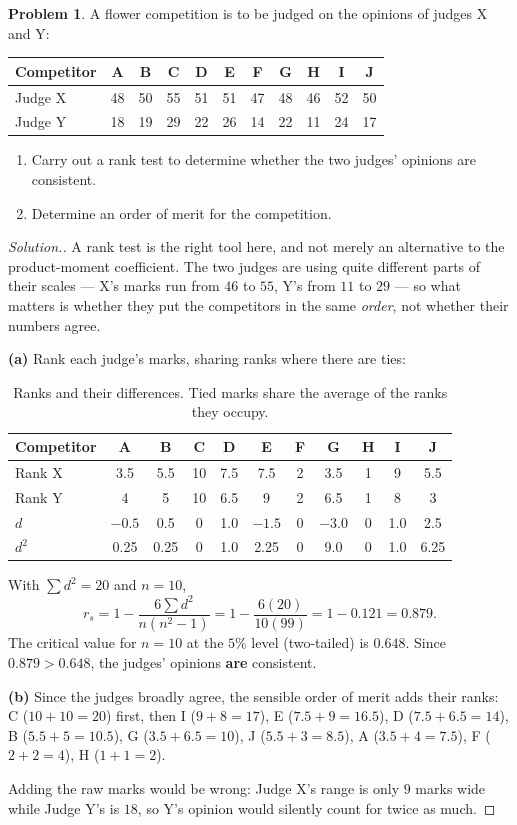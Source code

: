 \documentclass[11pt,a4paper]{article}
\theoremstyle{definition}
\newtheorem{problemx}{Problem}[section]
\newenvironment{problem}{\begin{problemx}}{\end{problemx}}
\newenvironment{solution}
  {\renewcommand{\qedsymbol}{}\begin{proof}[\textit{Solution}.]}
  {\end{proof}}
\begin{document}
\begin{problem}
A flower competition is to be judged on the opinions of judges X and Y:
\begin{table}[H]
\centering
\begin{tabular}{|l|c|c|c|c|c|c|c|c|c|c|}
\hline
Competitor & A & B & C & D & E & F & G & H & I & J\\
\hline
Judge X & 48 & 50 & 55 & 51 & 51 & 47 & 48 & 46 & 52 & 50\\
Judge Y & 18 & 19 & 29 & 22 & 26 & 14 & 22 & 11 & 24 & 17\\
\hline
\end{tabular}
\end{table}
\begin{enumerate}
\item[(a).] Carry out a rank test to determine whether the two judges' opinions are consistent.
\item[(b).] Determine an order of merit for the competition.
\end{enumerate}
\end{problem}

\begin{solution}
A rank test is the right tool here, and not merely an alternative to the product-moment
coefficient. The two judges are using quite different parts of their scales --- X's marks run
from $46$ to $55$, Y's from $11$ to $29$ --- so what matters is whether they put the
competitors in the same \emph{order}, not whether their numbers agree.

\textbf{(a)} Rank each judge's marks, sharing ranks where there are ties:
\begin{table}[H]
\centering
\begin{tabular}{|l|c|c|c|c|c|c|c|c|c|c|}
\hline
Competitor & A & B & C & D & E & F & G & H & I & J\\
\hline
Rank X & 3.5 & 5.5 & 10 & 7.5 & 7.5 & 2 & 3.5 & 1 & 9 & 5.5\\
Rank Y & 4 & 5 & 10 & 6.5 & 9 & 2 & 6.5 & 1 & 8 & 3\\
$d$ & $-0.5$ & 0.5 & 0 & 1.0 & $-1.5$ & 0 & $-3.0$ & 0 & 1.0 & 2.5\\
$d^2$ & 0.25 & 0.25 & 0 & 1.0 & 2.25 & 0 & 9.0 & 0 & 1.0 & 6.25\\
\hline
\end{tabular}
\caption{Ranks and their differences. Tied marks share the average of the ranks they occupy.}
\end{table}
With $\sum d^2=20$ and $n=10$,
\[r_s=1-\frac{6\sum d^2}{n(n^2-1)}=1-\frac{6(20)}{10(99)}=1-0.121=0.879.\]
The critical value for $n=10$ at the $5\%$ level (two-tailed) is $0.648$. Since
$0.879>0.648$, the judges' opinions \textbf{are} consistent.

\textbf{(b)} Since the judges broadly agree, the sensible order of merit adds their ranks:
C ($10+10=20$) first, then I ($9+8=17$), E ($7.5+9=16.5$), D ($7.5+6.5=14$), B
($5.5+5=10.5$), G ($3.5+6.5=10$), J ($5.5+3=8.5$), A ($3.5+4=7.5$), F ($2+2=4$), H
($1+1=2$).

Adding the raw marks would be wrong: Judge X's range is only $9$ marks wide while Judge Y's
is $18$, so Y's opinion would silently count for twice as much.
\end{solution}
\end{document}
